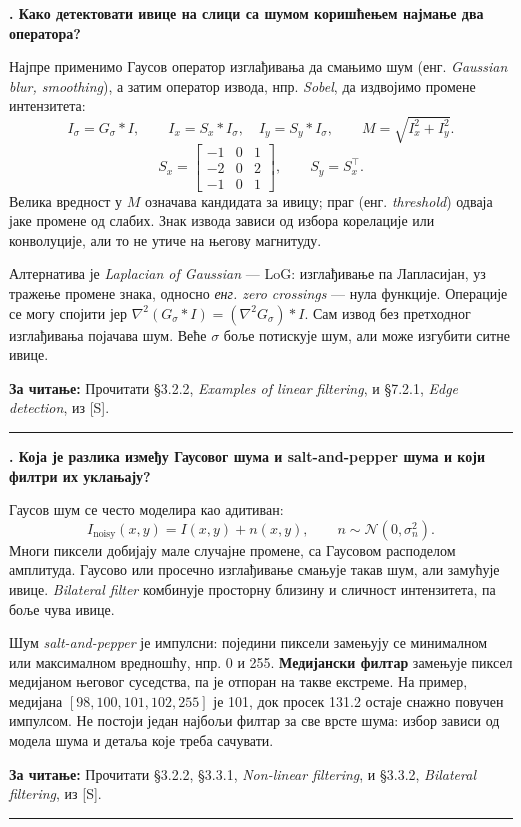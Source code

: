 \documentclass[10pt,a4paper]{article}
\newcommand{\en}[1]{\textit{#1}}
\newcounter{pitanje}
\newenvironment{odgovor}[1]{\stepcounter{pitanje}\begin{minipage}[t][0.455\textheight][t]{\textwidth}\vspace{0pt}\textbf{\thepitanje. #1}\par\smallskip}{\end{minipage}\par\ifodd\value{pitanje}\vspace{0.025\textheight}\hrule\vspace{0.015\textheight}\else\newpage\fi}
\newcommand{\izvor}[1]{\par\vfill{\footnotesize\textbf{За читање:} #1}\par}
\begin{document}
\newpage
\begin{odgovor}{Како детектовати ивице на слици са шумом коришћењем најмање два оператора?}
Најпре применимо Гаусов оператор изглађивања да смањимо шум (енг. \textit{Gaussian blur, smoothing}), а затим оператор извода, нпр. \en{Sobel}, да издвојимо промене интензитета:
\[
I_\sigma=G_\sigma*I,\qquad I_x=S_x*I_\sigma,\quad I_y=S_y*I_\sigma,\qquad
M=\sqrt{I_x^2+I_y^2}.
\]
\[
S_x=\begin{bmatrix}-1&0&1\\-2&0&2\\-1&0&1\end{bmatrix},\qquad S_y=S_x^\top.
\]
Велика вредност у $M$ означава кандидата за ивицу; праг (енг. \textit{threshold}) одваја јаке промене од слабих. Знак извода зависи од избора корелације или конволуције, али то не утиче на његову магнитуду.

Алтернатива је \en{Laplacian of Gaussian} — LoG: изглађивање па Лапласијан, уз тражење промене знака, односно \en{енг. zero crossings} --- нула функције. Операције се могу спојити јер $\nabla^2(G_\sigma*I)=(\nabla^2G_\sigma)*I$. Сам извод без претходног изглађивања појачава шум. Веће $\sigma$ боље потискује шум, али може изгубити ситне ивице.
\izvor{Прочитати §3.2.2, \en{Examples of linear filtering}, и §7.2.1, \en{Edge detection}, из [S].}
\end{odgovor}

\begin{odgovor}{Која је разлика између Гаусовог шума и salt-and-pepper шума и који филтри их уклањају?}
Гаусов шум се често моделира као адитиван:
\[
I_{\mathrm{noisy}}(x,y)=I(x,y)+n(x,y),\qquad n\sim\mathcal N(0,\sigma_n^2).
\]
Многи пиксели добијају мале случајне промене, са Гаусовом расподелом амплитуда. Гаусово или просечно изглађивање смањује такав шум, али замућује ивице. \en{Bilateral filter} комбинује просторну близину и сличност интензитета, па боље чува ивице.

Шум \en{salt-and-pepper} је импулсни: поједини пиксели замењују се минималном или максималном вредношћу, нпр. 0 и 255. \textbf{Медијански филтар} замењује пиксел медијаном његовог суседства, па је отпоран на такве екстреме. На пример, медијана $[98,100,101,102,255]$ је 101, док просек 131.2 остаје снажно повучен импулсом. Не постоји један најбољи филтар за све врсте шума: избор зависи од модела шума и детаља које треба сачувати.
\izvor{Прочитати §3.2.2, §3.3.1, \en{Non-linear filtering}, и §3.3.2, \en{Bilateral filtering}, из [S].}
\end{odgovor}
\end{document}
